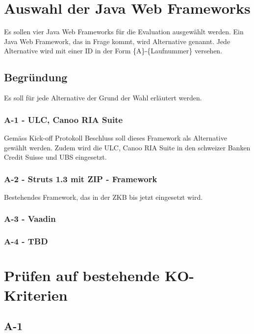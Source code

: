   \section{Auswahl der Java Web Frameworks}
  
  Es sollen vier Java Web Frameworks für die Evaluation ausgewählt werden. Ein
  Java Web Framework, das in Frage kommt, wird Alternative genannt. Jede
  Alternative wird mit einer ID in der Form \{A\}-\{Laufnummer\} versehen.
  
  \subsection{Begründung}
  
  Es soll für jede Alternative der Grund der Wahl erläutert werden.
  
  \subsubsection{A-1 - ULC, Canoo RIA Suite}
  
  Gemäss Kick-off Protokoll Beschluss soll dieses Framework als Alternative
  gewählt werden. Zudem wird die ULC, Canoo RIA Suite in den schweizer Banken
  Credit Suisse und UBS eingesetzt.
  
  \subsubsection{A-2 - Struts 1.3 mit ZIP - Framework}
  
  Bestehendes Framework, das in der ZKB bis jetzt eingesetzt wird.
  
  \subsubsection{A-3 - Vaadin}
  
  \subsubsection{A-4 - TBD}  
  
  \section{Prüfen auf bestehende KO-Kriterien}
  
  \subsection{A-1}
  
